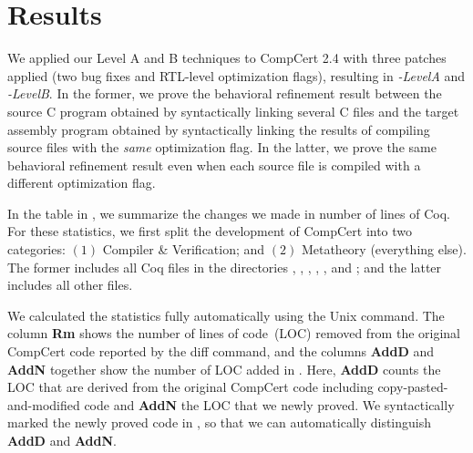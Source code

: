 \section{Results}

\newcommand{\specialcell}[2][c]{%
  \begin{tabular}[#1]{@{}c@{}}#2\end{tabular}}


We applied our Level A and B techniques to CompCert 2.4 with three
patches applied (two bug fixes and RTL-level optimization flags),
resulting in \emph{\sepcomp-LevelA} and \emph{\sepcomp-LevelB}.
In the former, we prove the behavioral refinement result between the
source C program obtained by syntactically linking several C files and
the target assembly program obtained by syntactically linking the
results of compiling source files with the \emph{same} optimization
flag.  In the latter, we prove the same behavioral refinement result
even when each source file is compiled with a different optimization
flag.

In the table in , we summarize the changes we
made in number of lines of Coq.  For these statistics, we first split
the development of CompCert into two categories: $(1)$ Compiler \&
Verification; and $(2)$ Metatheory (\ie everything else). The former
includes all Coq files in the directories ,
, , , , and
; and the latter includes all other files.

We calculated the statistics fully automatically using the Unix
 command. The column \textbf{Rm} shows the number of
lines of code~(LOC) removed from the original CompCert code reported
by the diff command, and the columns \textbf{AddD} and \textbf{AddN}
together show the number of LOC added in \sepcomp.  Here,
\textbf{AddD} counts the LOC that are derived from the original
CompCert code including copy-pasted-and-modified code and \textbf{AddN}
the LOC that we newly proved. We syntactically marked the newly proved
code in \sepcomp, so that we can automatically distinguish
\textbf{AddD} and \textbf{AddN}.

